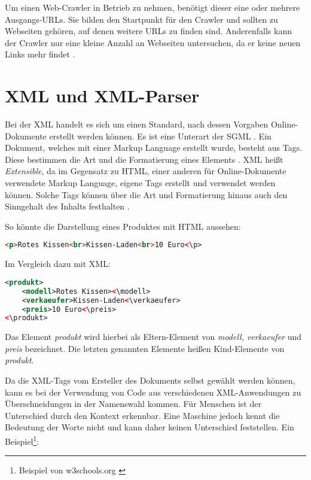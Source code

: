 Um einen Web-Crawler in Betrieb zu nehmen, benötigt dieser eine oder mehrere Ausgangs-URLs. Sie bilden den Startpunkt für den Crawler und sollten zu Webseiten gehören, auf denen weitere URLs zu finden sind. Anderenfalls kann der Crawler nur eine kleine Anzahl an Webseiten untersuchen, da er keine neuen Links mehr findet \cite{how}. 


\newpage

\section{XML und XML-Parser}
Bei der \ac{XML} handelt es sich um einen Standard, nach dessen Vorgaben Online-Dokumente erstellt werden können. Es ist eine Unterart der \ac{SGML} \cite{xmldef}. Ein Dokument, welches mit einer Markup Language erstellt wurde, besteht aus Tags. Diese bestimmen die Art und die Formatierung eines Elements \cite{markup}. \ac{XML} heißt \textit{Extensible}, da im Gegensatz zu \ac{HTML}, einer anderen für Online-Dokumente verwendete Markup Language, eigene Tags erstellt und verwendet werden können. Solche Tags können über die Art und Formatierung hinaus auch den Sinngehalt des Inhalts festhalten \cite{xmldef}.

So könnte die Darstellung eines Produktes mit \acs{HTML} aussehen: \\
\begin{lstlisting}[title=Beispiel-Code HTML, language=HTML]
<p>Rotes Kissen<br>Kissen-Laden<br>10 Euro<\p>
\end{lstlisting}

Im Vergleich dazu mit \ac{XML}: \\

\begin{lstlisting}[title=Beispiel-Code XML, language=XML, morekeywords={produkt, modell, verkaeufer, preis}]
<produkt>
	<modell>Rotes Kissen><\modell>
	<verkaeufer>Kissen-Laden<\verkaeufer>
	<preis>10 Euro<\preis>
<\produkt>
\end{lstlisting}

Das Element \textit{produkt} wird hierbei als Eltern-Element von \textit{modell, verkaeufer} und \textit{preis} bezeichnet. Die letzten genannten Elemente heißen Kind-Elemente von \textit{produkt}.
 
Da die XML-Tags vom Ersteller des Dokuments selbst gewählt werden können, kann es bei der Verwendung von Code aus verschiedenen \ac{XML}-Anwendungen  zu Überschneidungen in der Namenswahl kommen. Für Menschen ist der Unterschied durch den Kontext erkennbar. Eine Maschine jedoch kennt die Bedeutung der Worte nicht und kann daher keinen Unterschied feststellen. Ein Beispiel\footnote{Beispiel von w3schools.org \cite{w3s}}: \\

